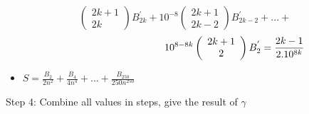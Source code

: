 \documentclass{article}
\begin{document}
\begin{multicols}{3}
{\begin{minipage}[t]{.98\linewidth}
\begin{itemize}
                \vspace{-0.6cm}
                \begin{equation*}
                            \left(
                            \begin{array}{cc}
                                2k+1 \\2k  
                            \end{array}
                            \right)B_{2k}^{'} +10^{-8}
                            \left(
                            \begin{array}{cc}
                                2k+1 \\2k-2  
                            \end{array}
                            \right)B_{2k-2}^{'}+...+   
                \end{equation*}
                \begin{equation*}
                \vspace{-0.06cm}
                     \hspace{3.5cm}
                            10^{8-8k}\left(
                            \begin{array}{cc}
                                2k+1 \\2  
                            \end{array}
                            \right)B_2^{'} =\frac{2k-1}{2.10^{8k}}
                \end{equation*}
            \end{itemize}
            
            \begin{itemize}
                \item\Large $S=\frac{B_2}{2n^2}+\frac{B_4}{4n^4}+...+\frac{B_250}{250n^250}$
            \end{itemize}
                \end{minipage}
            }
            
            \vspace{0.3cm}\hspace{-0.5cm}\Large Step 4: Combine all values in steps, give the result of $\gamma$	
	\end{multicols}
	
\end{document}
